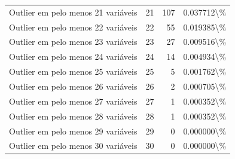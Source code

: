 \begin{table}
\begin{tabular}{lrrl}
Outlier em pelo menos 21 variáveis & 21 & 107 & 0.037712\textbackslash \% \\
Outlier em pelo menos 22 variáveis & 22 & 55 & 0.019385\textbackslash \% \\
Outlier em pelo menos 23 variáveis & 23 & 27 & 0.009516\textbackslash \% \\
Outlier em pelo menos 24 variáveis & 24 & 14 & 0.004934\textbackslash \% \\
Outlier em pelo menos 25 variáveis & 25 & 5 & 0.001762\textbackslash \% \\
Outlier em pelo menos 26 variáveis & 26 & 2 & 0.000705\textbackslash \% \\
Outlier em pelo menos 27 variáveis & 27 & 1 & 0.000352\textbackslash \% \\
Outlier em pelo menos 28 variáveis & 28 & 1 & 0.000352\textbackslash \% \\
Outlier em pelo menos 29 variáveis & 29 & 0 & 0.000000\textbackslash \% \\
Outlier em pelo menos 30 variáveis & 30 & 0 & 0.000000\textbackslash \% \\
\bottomrule
\end{tabular}
\end{table}
